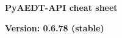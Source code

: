 \documentclass[9pt,landscape]{article}
\begin{document}
\footnotesize
\justifying
\begin{center}
     \Huge{\textbf{PyAEDT-API cheat sheet}} \\
\end{center}
\begin{center}
\small{\textbf{Version: 0.6.78 (stable) }} \\
\end{center}
\vspace{-0.15cm}
\noindent\makebox[\linewidth]{\rule{\paperwidth}{2pt}}
\end{document}
